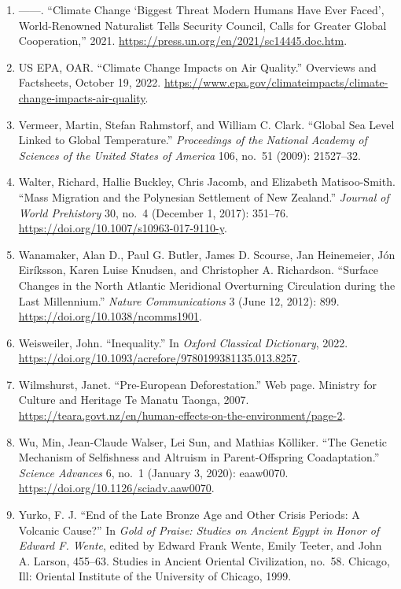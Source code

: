 \documentclass[12pt]{article}
\begin{document}
\begin{enumerate}[leftmargin=*]
\item ---{}---. ``Climate Change `Biggest Threat Modern Humans Have Ever Faced', World-Renowned Naturalist Tells Security Council, Calls for Greater Global Cooperation,'' 2021. \url{https://press.un.org/en/2021/sc14445.doc.htm}.
\item US EPA, OAR. ``Climate Change Impacts on Air Quality.'' Overviews and Factsheets, October 19, 2022. \url{https://www.epa.gov/climateimpacts/climate-change-impacts-air-quality}.
\item Vermeer, Martin, Stefan Rahmstorf, and William C. Clark. ``Global Sea Level Linked to Global Temperature.'' \textit{Proceedings of the National Academy of Sciences of the United States of America} 106, no.\ 51 (2009): 21527--32.
\item Walter, Richard, Hallie Buckley, Chris Jacomb, and Elizabeth Matisoo-Smith. ``Mass Migration and the Polynesian Settlement of New Zealand.'' \textit{Journal of World Prehistory} 30, no.\ 4 (December 1, 2017): 351--76. \url{https://doi.org/10.1007/s10963-017-9110-y}.
\item Wanamaker, Alan D., Paul G. Butler, James D. Scourse, Jan Heinemeier, Jón Eiríksson, Karen Luise Knudsen, and Christopher A. Richardson. ``Surface Changes in the North Atlantic Meridional Overturning Circulation during the Last Millennium.'' \textit{Nature Communications} 3 (June 12, 2012): 899. \url{https://doi.org/10.1038/ncomms1901}.
\item Weisweiler, John. ``Inequality.'' In \textit{Oxford Classical Dictionary}, 2022. \url{https://doi.org/10.1093/acrefore/9780199381135.013.8257}.
\item Wilmshurst, Janet. ``Pre-European Deforestation.'' Web page. Ministry for Culture and Heritage Te Manatu Taonga, 2007. \url{https://teara.govt.nz/en/human-effects-on-the-environment/page-2}.
\item Wu, Min, Jean-Claude Walser, Lei Sun, and Mathias Kölliker. ``The Genetic Mechanism of Selfishness and Altruism in Parent-Offspring Coadaptation.'' \textit{Science Advances} 6, no.\ 1 (January 3, 2020): eaaw0070. \url{https://doi.org/10.1126/sciadv.aaw0070}.
\item Yurko, F. J. ``End of the Late Bronze Age and Other Crisis Periods: A Volcanic Cause?'' In \textit{Gold of Praise: Studies on Ancient Egypt in Honor of Edward F. Wente}, edited by Edward Frank Wente, Emily Teeter, and John A. Larson, 455--63. Studies in Ancient Oriental Civilization, no.\ 58. Chicago, Ill: Oriental Institute of the University of Chicago, 1999.
\end{enumerate}
\end{document}
